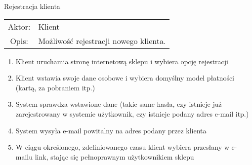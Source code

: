  \item Rejestracja klienta \\
  \begin{tabularx}{\linewidth}{ c X }
  Aktor: & Klient \\
  Opis: & Możliwość rejestracji nowego klienta.\\
  \end{tabularx}
   \begin{enumerate}
    \item Klient uruchamia stronę internetową sklepu i wybiera opcję rejestracji
    \item Klient wstawia swoje dane osobowe i wybiera domyślny model płatności
    (kartą, za pobraniem itp.)
    \item System sprawdza wstawione dane (takie same hasła, czy istnieje już
    zarejestrowany w systemie użytkownik, czy istnieje podany adres e-mail itp.)
    \item System wysyła e-mail powitalny na adres podany przez klienta
    \item W ciągu określonego, zdefiniowanego czasu klient wybiera przesłany w
    e-mailu link, stając się pełnoprawnym użytkownikiem sklepu
  \end{enumerate}